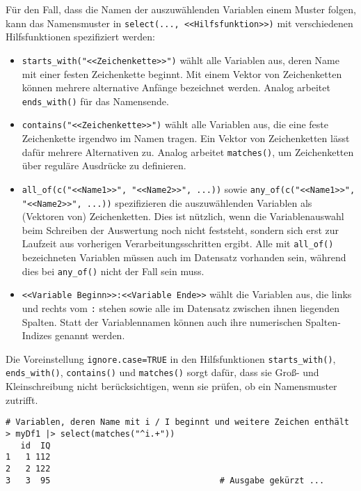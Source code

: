Für den Fall, dass die Namen der auszuwählenden Variablen einem Muster folgen, kann das Namensmuster in \lstinline!select(..., <<Hilfsfunktion>>)! mit verschiedenen Hilfsfunktionen spezifiziert werden:
\begin{itemize}
\item \lstinline!starts_with("<<Zeichenkette>>")! wählt alle Variablen aus, deren Name mit einer festen Zeichenkette beginnt. Mit einem Vektor von Zeichenketten können mehrere alternative Anfänge bezeichnet werden. Analog arbeitet \lstinline!ends_with()! für das Namensende.
\item \lstinline!contains("<<Zeichenkette>>")! wählt alle Variablen aus, die eine feste Zeichenkette irgendwo im Namen tragen. Ein Vektor von Zeichenketten lässt dafür mehrere Alternativen zu. Analog arbeitet \lstinline!matches()!, um Zeichenketten über reguläre Ausdrücke zu definieren.
\item \lstinline!all_of(c("<<Name1>>", "<<Name2>>", ...))! sowie \lstinline!any_of(c("<<Name1>>", "<<Name2>>", ...))! spezifizieren die auszuwählenden Variablen als (Vektoren von) Zeichenketten. Dies ist nützlich, wenn die Variablenauswahl beim Schreiben der Auswertung noch nicht feststeht, sondern sich erst zur Laufzeit aus vorherigen Verarbeitungsschritten ergibt. Alle mit \lstinline!all_of()! bezeichneten Variablen müssen auch im Datensatz vorhanden sein, während dies bei \lstinline!any_of()! nicht der Fall sein muss.
\item \lstinline!<<Variable Beginn>>:<<Variable Ende>>! wählt die Variablen aus, die links und rechts vom \lstinline!:! stehen sowie alle im Datensatz zwischen ihnen liegenden Spalten. Statt der Variablennamen können auch ihre numerischen Spalten-Indizes genannt werden.
\end{itemize}

Die Voreinstellung \lstinline!ignore.case=TRUE! in den Hilfsfunktionen \lstinline!starts_with()!, \lstinline!ends_with()!, \lstinline!contains()! und \lstinline!matches()! sorgt dafür, dass sie Groß- und Kleinschreibung nicht berücksichtigen, wenn sie prüfen, ob ein Namensmuster zutrifft.
\begin{lstlisting}
# Variablen, deren Name mit i / I beginnt und weitere Zeichen enthält
> myDf1 |> select(matches("^i.+"))
   id  IQ
1   1 112
2   2 122
3   3  95                                  # Ausgabe gekürzt ...
\end{lstlisting}

